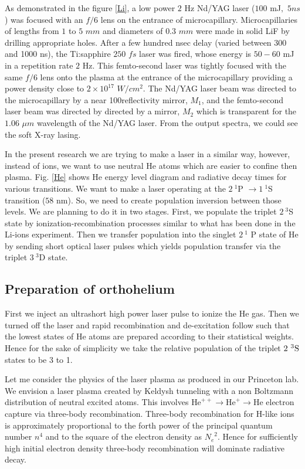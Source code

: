 As demonstrated in the figure \ref{Li}, a low power $2$ Hz Nd/YAG laser ($100
$ mJ$,$ $5ns$) was focused with an $f/6$ lens on the entrance of
microcapillary. Microcapillaries of lengths from $1$ to $5$ $mm$ and
diameters of $0.3$ $mm$ were made in solid LiF by drilling appropriate
holes. After a few hundred nsec delay (varied between 300 and 1000 ns), the
Ti:sapphire $250$ $fs$ laser was fired, whose energy is $50-60$ mJ in a
repetition rate $2$ Hz. This femto-second laser was tightly focused with the
same $f/6$ lens onto the plasma at the entrance of the microcapillary
providing a power density close to $2\times 10^{17}$ $W/{cm}^{2}$. The
Nd/YAG laser beam was directed to the microcapillary by a near
100reflectivity mirror, $M_{1}$, and the femto-second laser beam was
directed by directed by a mirror, $M_{2}$ which is transparent for the $1.06$
$\mu m$ wavelength of the Nd/YAG laser. From the output spectra, we could
see the soft X-ray lasing.

In the present research we are trying to make a laser in a similar way,
however, instead of ions, we want to use neutral He atoms which are easier
to confine then plasma. Fig. \ref{He} shows He energy level diagram and
radiative decay times for various transitions. We want to make a laser
operating at the $2~^{1}$P $\rightarrow 1~^{1}$S transition ($58$ nm). So,
we need to create population inversion between those levels. We are planning
to do it in two stages. First, we populate the triplet $2~^{3}$S
state by ionization-recombination processes similar to what has been done in
the Li-ions experiment. Then we transfer population into the singlet $2~^{1}$
P state of He by sending short optical laser pulses which yields population
transfer via the triplet $3~^{3}$D state.

\subsection{Preparation of orthohelium}
First we inject an ultrashort high power laser pulse to ionize the He gas.
Then we turned off the laser and rapid recombination and de-excitation
follow such that the lowest states of He atoms are prepared according to
their statistical weights. Hence for the sake of simplicity we take the
relative population of the triplet $2~^{3}\text{%
  S}$ states to be 3 to 1.

Let me consider the physics of the laser plasma as produced in our Princeton
lab. We envision a laser plasma created by Keldysh tunneling with a non
Boltzmann distribution of neutral excited atoms. This involves $\text{He}%
^{++}\rightarrow \text{He}^{+}\rightarrow \text{He}$ electron capture via
three-body recombination. Three-body recombination for H-like ions is
approximately proportional to the forth power of the principal quantum
number $n^{4}$ and to the square of the electron density as ${N_{e}}^{2}$.
Hence for sufficiently high initial electron density three-body
recombination will dominate radiative decay.

